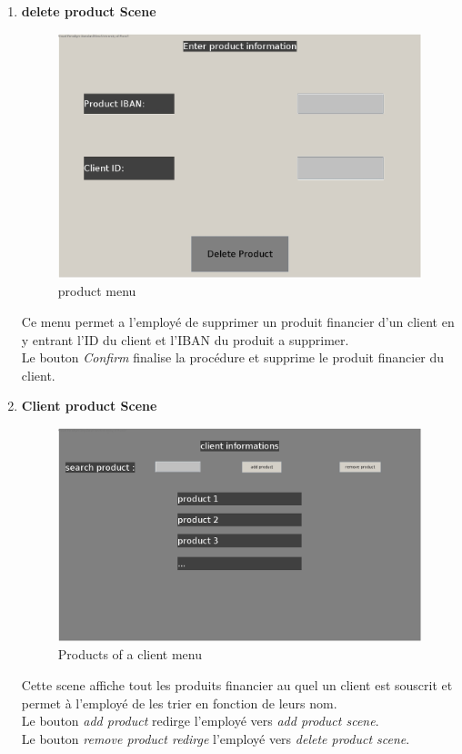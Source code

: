 \documentclass[../rapport.tex]{subfiles}
\begin{document}
\begin{enumerate}
\item \textbf{delete product Scene} \\
		\begin{figure}[h!]
				\centering \includegraphics[scale=0.2]{ressources/photos_diagrammes/app2/gui/deleteMenu.jpg}
				\caption{ product menu}
		\end{figure}
Ce menu permet a l'employé de supprimer un produit financier d'un client en y entrant l'ID du client et l'IBAN du produit a supprimer.\\
Le bouton \textit{Confirm} finalise la procédure et supprime le produit financier du client.\\
\newpage
\item \textbf{Client product Scene} \\
		\begin{figure}[h!]
				\centering \includegraphics[scale=0.2]{ressources/photos_diagrammes/app2/gui/clientProductMenu.jpg}
				\caption{ Products of a client menu}
		\end{figure}
Cette scene affiche tout les produits financier au quel un client est souscrit et permet à l'employé de les trier en fonction de leurs nom.\\
Le bouton \textit{add product} redirge l'employé vers \textit{add product scene}.\\
Le bouton \textit{remove product redirge} l'employé vers \textit{delete product scene}.\\



\end{enumerate}
\end{document}
